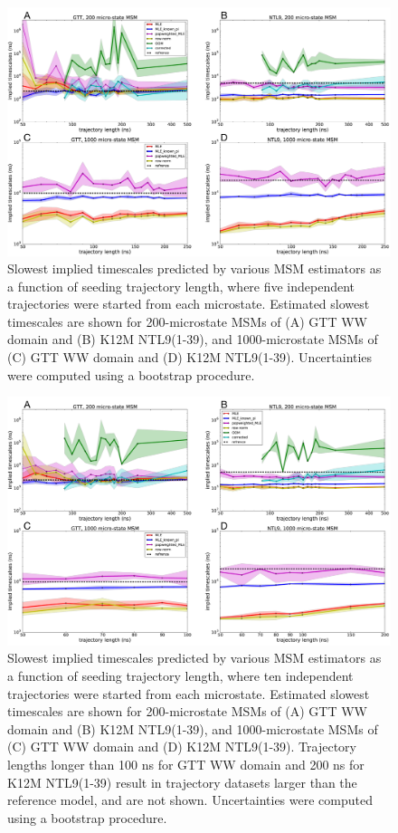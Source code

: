 \documentclass[%
 aip,
rsi,%
 amsmath,amssymb,
 reprint,%
]{revtex4-1}
\begin{document}
\begin{figure}[ht!]
\includegraphics[width=0.55\paperwidth]{figures/all_slowest_timescales_cluster_200_and_1000_omi.pdf}
\caption{Slowest implied timescales predicted by various MSM estimators as a function of seeding trajectory length, where five independent trajectories were started from each microstate.  Estimated slowest timescales are shown for 200-microstate MSMs of (A) GTT WW domain and (B) K12M NTL9(1-39), and 1000-microstate MSMs of (C) GTT WW domain and (D) K12M NTL9(1-39). Uncertainties were computed using a bootstrap procedure.}
\label{fig:all-atom-timescales-5seeds}
\end{figure}

\begin{figure}[ht!]
\includegraphics[width=0.55\paperwidth]{figures/all_slowest_timescales_cluster_200_and_1000_10trajs_omi.pdf}%
\caption{Slowest implied timescales predicted by various MSM estimators as a function of seeding trajectory length, where ten independent trajectories were started from each microstate. Estimated slowest timescales are shown for 200-microstate MSMs of (A) GTT WW domain and (B) K12M NTL9(1-39), and 1000-microstate MSMs of (C) GTT WW domain and (D) K12M NTL9(1-39). Trajectory lengths longer than 100 ns for GTT WW domain and 200 ns for K12M NTL9(1-39) result in trajectory datasets larger than the reference model, and are not shown. Uncertainties were computed using a bootstrap procedure. }
\label{fig:all-atom-timescales-10seeds}
\end{figure}
\end{document}
